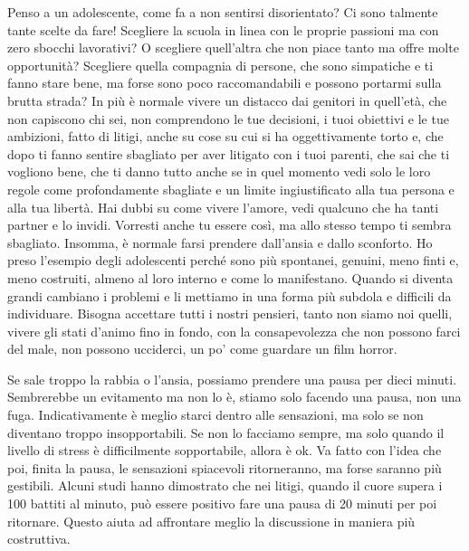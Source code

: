 \documentclass[12pt]{book} %
\begin{document}
Penso a un adolescente, come fa a non sentirsi disorientato? Ci sono talmente tante scelte da fare! Scegliere la scuola
in linea con le proprie passioni ma con zero sbocchi lavorativi? O scegliere quell'altra che non
piace tanto ma offre molte opportunità? Scegliere quella compagnia di persone, che sono simpatiche e ti fanno stare
bene, ma forse sono poco raccomandabili e possono portarmi sulla brutta strada? In più è normale vivere un distacco dai
genitori in quell'età, che non capiscono chi sei, non comprendono le tue decisioni, i tuoi
obiettivi e le tue ambizioni, fatto di litigi, anche su cose su cui si ha oggettivamente torto e, che dopo ti fanno
sentire sbagliato per aver litigato con i tuoi parenti, che sai che ti vogliono bene, che ti danno tutto anche se in
quel momento vedi solo le loro regole come profondamente sbagliate e un limite ingiustificato alla tua persona e alla
tua libertà. Hai dubbi su come vivere l'amore, vedi qualcuno che ha tanti partner e lo invidi.
Vorresti anche tu essere così, ma allo stesso tempo ti sembra sbagliato. Insomma, è normale farsi prendere
dall'ansia e dallo sconforto. Ho preso l'esempio degli adolescenti perché
sono più spontanei, genuini, meno finti e, meno costruiti, almeno al loro interno e come lo manifestano. Quando si
diventa grandi cambiano i problemi e li mettiamo in una forma più subdola e difficili da individuare. Bisogna accettare
tutti i nostri pensieri, tanto non siamo noi quelli, vivere gli stati d'animo fino in fondo, con
la consapevolezza che non possono farci del male, non possono ucciderci, un po' come guardare un film horror. 

Se sale troppo la rabbia o l'ansia, possiamo prendere una pausa per dieci minuti. Sembrerebbe un evitamento ma non lo è,
stiamo solo facendo una pausa, non una fuga. Indicativamente è meglio starci dentro alle sensazioni, ma solo se non
diventano troppo insopportabili. Se non lo facciamo sempre, ma solo quando il livello di stress è difficilmente
sopportabile, allora è ok. Va fatto con l'idea che poi, finita la pausa, le sensazioni spiacevoli ritorneranno, ma
forse saranno più gestibili. Alcuni studi hanno dimostrato che nei litigi, quando il cuore supera i 100 battiti al
minuto, può essere positivo fare una pausa di 20 minuti per poi ritornare. Questo aiuta ad affrontare meglio la
discussione in maniera più costruttiva. 


\bigskip
\end{document}
